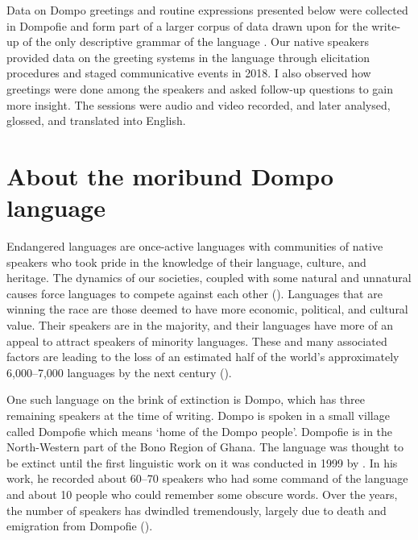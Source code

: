 \documentclass[output=paper,colorlinks,citecolor=brown]{langscibook}
\begin{document}
\begin{sloppypar}
Data on Dompo greetings and routine expressions presented below were collected in Dompofie and form part of a larger corpus of data drawn upon for the write-up of the only descriptive grammar of the language \citep{Manu-Barfo2020}. Our native speakers provided data on the greeting systems in the language through elicitation procedures and staged communicative events in 2018. I also observed how greetings were done among the speakers and asked follow-up questions to gain more insight. The sessions were audio and video recorded, and later analysed, glossed, and translated into English.
\end{sloppypar}

\section{About the moribund Dompo language}

Endangered languages  are once-active languages with communities of native speakers who took pride in the knowledge of their language, culture, and heritage. The dynamics of our societies, coupled with some natural and unnatural causes force languages to compete against each other (\cite[56]{Sallabank2012}). Languages that are winning the race are those deemed to have more economic, political, and cultural value. Their speakers are in the majority, and their languages have more of an appeal to attract speakers of minority languages. These and many associated factors are leading to the loss of an estimated half of the world's approximately 6,000--7,000 languages by the next century (\cite[1]{GrenobleandWhaley2006}). 

One such language on the brink of extinction is Dompo, which has three remaining speakers at the time of writing. Dompo is spoken in a small village called Dompofie which means ‘home of the Dompo people’. Dompofie is in the North-Western part of the Bono Region of Ghana. The language was thought to be extinct until the first linguistic work on it was conducted in 1999 by \citet{Blench2007}. In his work, he recorded about 60--70 speakers who had some command of the language and about 10 people who could remember some obscure words. Over the years, the number of speakers has dwindled tremendously,  largely due to death and emigration from Dompofie (\cite{Manu-Barfo2020}). 
\end{document}
